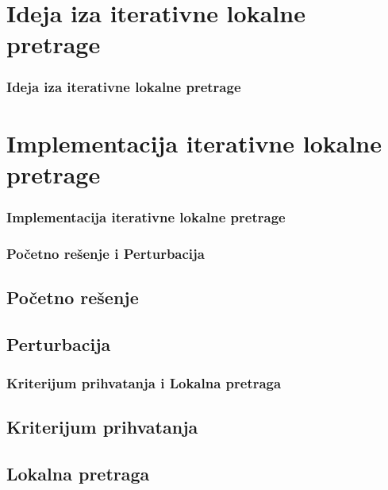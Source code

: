 \documentclass{beamer}
\begin{document}
\section{Ideja iza iterativne lokalne pretrage}
\begin{frame}
	\frametitle{Ideja iza iterativne lokalne pretrage} 

\end{frame}

\section{Implementacija iterativne lokalne pretrage}
\begin{frame}[fragile]\frametitle{Implementacija iterativne lokalne pretrage}
 
\end{frame}

\begin{frame}[fragile]\frametitle{Početno rešenje i Perturbacija}
	\subsection{Početno rešenje}
	\subsection{Perturbacija}

\end{frame}




\begin{frame}[fragile]\frametitle{Kriterijum prihvatanja i Lokalna pretraga}
	\subsection{Kriterijum prihvatanja}
	\subsection{Lokalna pretraga}
\end{frame}
\end{document}
